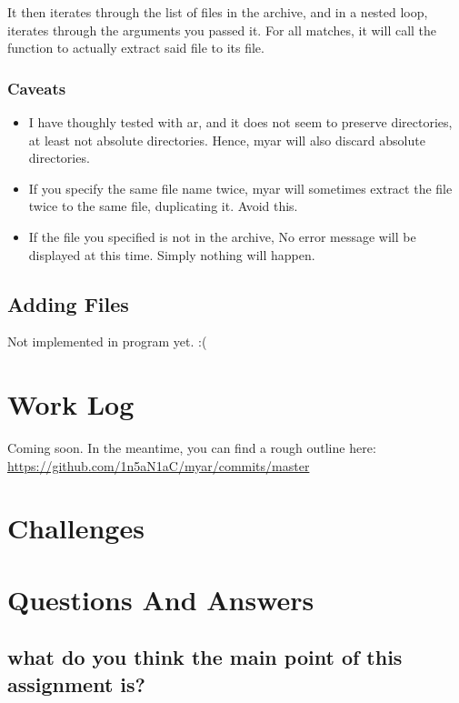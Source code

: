 \documentclass[letterpaper,10pt,titlepage]{article}
\begin{document}
It then iterates through the list of files in the archive, and in a nested loop, iterates through the arguments you passed it.  For all matches, it will call the function to actually extract said file to its file.

\subsubsection{Caveats}

\begin{itemize}
\item I have thoughly tested with ar, and it does not seem to preserve directories, at least not absolute directories.  Hence, myar will also discard absolute directories.
\item If you specify the same file name twice, myar will sometimes extract the file twice to the same file, duplicating it.  Avoid this.
\item If the file you specified is not in the archive, No error message will be displayed at this time.  Simply nothing will happen.
\end{itemize}

\subsection{Adding Files}

Not implemented in program yet.  :(

\section{Work Log}

Coming soon.  In the meantime, you can find a rough outline here:
\url{https://github.com/1n5aN1aC/myar/commits/master}

\section{Challenges}

\section{Questions And Answers}

\subsection{what do you think the main point of this assignment is?}
\end{document}
